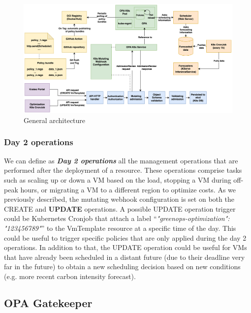 \begin{figure}[htb]
\centering
\includegraphics[width=1\linewidth]{images/architecture.png}
\caption{General architecture}
\label{fig:architecture}
\end{figure}

\subsubsection{Day 2 operations}
\label{sec:day2_operations}

We can define as \textbf{\textit{Day 2 operations}} all the management operations that are performed after the deployment of a resource.
These operations comprise tasks such as scaling up or down a VM based on the load, stopping a VM during off-peak hours, or migrating a VM to a different region to optimize costs.
As we previously described, the mutating webhook configuration is set on both the CREATE and \textbf{UPDATE} operations.
A possible UPDATE operation trigger could be Kubernetes Cronjob that attach a label ``\textit{"greenops-optimization": "123456789"}'' to the VmTemplate resource at a specific time of the day.
This could be useful to trigger specific policies that are only applied during the day 2 operations.
In addition to that, the UPDATE operation could be useful for VMs that have already been scheduled in a distant future (due to their deadline very far in the future) to obtain a new scheduling decision based on new conditions (e.g. more recent carbon intensity forecast).

\subsection{OPA Gatekeeper}


